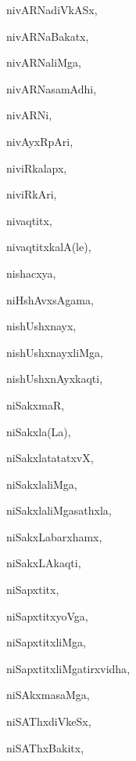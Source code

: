 \begin{multicols}{3}
{\noindent
{nivARNadiVkASx}, \pageref{nivARNadiVkASx}

\noindent
{nivARNaBakatx}, \pageref{nivARNaBakatx}

\noindent
{nivARNaliMga}, \pageref{nivARNaliMga}

\noindent
{nivARNasamAdhi}, \pageref{nivARNasamAdhi}

\noindent
{nivARNi}, \pageref{nivARNi}

\noindent
{nivAyxRpAri}, \pageref{nivAyxRpAri}

\noindent
{niviRkalapx}, \pageref{niviRkalapx}

\noindent
{niviRkAri}, \pageref{niviRkAri}

\noindent
{nivaqtitx}, \pageref{nivaqtitx}

\noindent
{nivaqtitxkalA(le)}, \pageref{nivaqtitxkalAle}

\noindent
{nishacxya}, \pageref{nishacxya}

\noindent
{niHshAvxsAgama}, \pageref{niHshAvxsAgama}

\noindent
{nishUshxnayx}, \pageref{nishUshxnayx}

\noindent
{nishUshxnayxliMga}, \pageref{nishUshxnayxliMga}

\noindent
{nishUshxnAyxkaqti}, \pageref{nishUshxnAyxkaqti}

\noindent
{niSakxmaR}, \pageref{niSakxmaR}

\noindent
{niSakxla(La)}, \pageref{niSakxlaLa}

\noindent
{niSakxlatatatxvX}, \pageref{niSakxlatatatxvX}

\noindent
{niSakxlaliMga}, \pageref{niSakxlaliMga}

\noindent
{niSakxlaliMgasathxla}, \pageref{niSakxlaliMgasathxla}

\noindent
{niSakxLabarxhamx}, \pageref{niSakxLabarxhamx}

\noindent
{niSakxLAkaqti}, \pageref{niSakxLAkaqti}

\noindent
{niSapxtitx}, \pageref{niSapxtitx}

\noindent
{niSapxtitxyoVga}, \pageref{niSapxtitxyoVga}

\noindent
{niSapxtitxliMga}, \pageref{niSapxtitxliMga}

\noindent
{niSapxtitxliMgatirxvidha}, \pageref{niSapxtitxliMgatirxvidha}

\noindent
{niSAkxmasaMga}, \pageref{niSAkxmasaMga}

\noindent
{niSAThxdiVkeSx}, \pageref{niSAThxdiVkeSx}

\noindent
{niSAThxBakitx}, \pageref{niSAThxBakitx}

}
\end{multicols}
